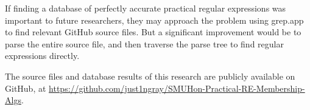 If finding a database of perfectly accurate practical regular expressions was important to future researchers, they may approach the problem using grep.app to find relevant GitHub source files. But a significant improvement would be to parse the entire source file, and then traverse the parse tree to find regular expressions directly.

The source files and database results of this research are publicly available on GitHub, at \url{https://github.com/just1ngray/SMUHon-Practical-RE-Membership-Algs}.













